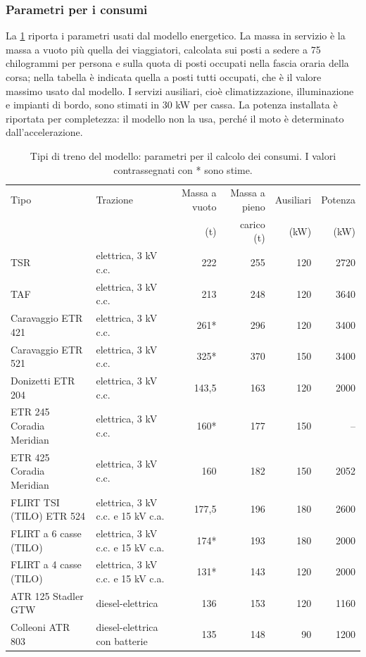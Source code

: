 \subsubsection{Parametri per i consumi}
La \cref{tab:rotabile-energia} riporta i parametri usati dal modello energetico. La massa in servizio è la massa a vuoto più quella dei viaggiatori, calcolata sui posti a sedere a 75 chilogrammi per persona e sulla quota di posti occupati nella fascia oraria della corsa; nella tabella è indicata quella a posti tutti occupati, che è il valore massimo usato dal modello. I servizi ausiliari, cioè climatizzazione, illuminazione e impianti di bordo, sono stimati in 30 kW per cassa. La potenza installata è riportata per completezza: il modello non la usa, perché il moto è determinato dall'accelerazione.

\begin{table}[H]
	\centering
	\caption{Tipi di treno del modello: parametri per il calcolo dei consumi. I valori contrassegnati con * sono stime.}
	\label{tab:rotabile-energia}
	\small
	\begin{tabularx}{\textwidth}{Xlrrrr}
		\toprule
		Tipo & Trazione & Massa a vuoto & Massa a pieno & Ausiliari & Potenza \\
		 & & (t) & carico (t) & (kW) & (kW) \\
		\midrule
		TSR & elettrica, 3 kV c.c. & 222 & 255 & 120 & 2720 \\
		TAF & elettrica, 3 kV c.c. & 213 & 248 & 120 & 3640 \\
		Caravaggio ETR 421 & elettrica, 3 kV c.c. & 261* & 296 & 120 & 3400 \\
		Caravaggio ETR 521 & elettrica, 3 kV c.c. & 325* & 370 & 150 & 3400 \\
		Donizetti ETR 204 & elettrica, 3 kV c.c. & 143,5 & 163 & 120 & 2000 \\
		ETR 245 Coradia Meridian & elettrica, 3 kV c.c. & 160* & 177 & 150 & -- \\
		ETR 425 Coradia Meridian & elettrica, 3 kV c.c. & 160 & 182 & 150 & 2052 \\
		FLIRT TSI (TILO) ETR 524 & elettrica, 3 kV c.c. e 15 kV c.a. & 177,5 & 196 & 180 & 2600 \\
		FLIRT a 6 casse (TILO) & elettrica, 3 kV c.c. e 15 kV c.a. & 174* & 193 & 180 & 2000 \\
		FLIRT a 4 casse (TILO) & elettrica, 3 kV c.c. e 15 kV c.a. & 131* & 143 & 120 & 2000 \\
		ATR 125 Stadler GTW & diesel-elettrica & 136 & 153 & 120 & 1160 \\
		Colleoni ATR 803 & diesel-elettrica con batterie & 135 & 148 & 90 & 1200 \\
		\bottomrule
	\end{tabularx}
\end{table}


